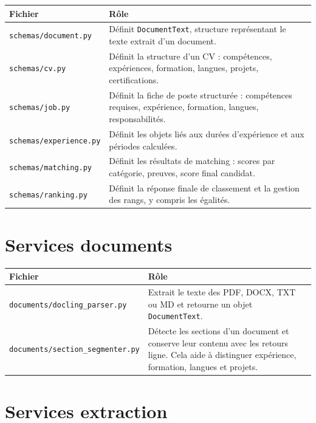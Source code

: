 \documentclass[12pt,a4paper]{report}
\begin{document}
\begin{longtable}{|p{5cm}|p{9cm}|}
\hline
\textbf{Fichier} & \textbf{Rôle} \\
\hline
\endhead
\texttt{schemas/document.py} & Définit \texttt{DocumentText}, structure représentant le texte extrait d'un document. \\
\hline
\texttt{schemas/cv.py} & Définit la structure d'un CV : compétences, expériences, formation, langues, projets, certifications. \\
\hline
\texttt{schemas/job.py} & Définit la fiche de poste structurée : compétences requises, expérience, formation, langues, responsabilités. \\
\hline
\texttt{schemas/experience.py} & Définit les objets liés aux durées d'expérience et aux périodes calculées. \\
\hline
\texttt{schemas/matching.py} & Définit les résultats de matching : scores par catégorie, preuves, score final candidat. \\
\hline
\texttt{schemas/ranking.py} & Définit la réponse finale de classement et la gestion des rangs, y compris les égalités. \\
\hline
\end{longtable}

\section{Services documents}

\begin{longtable}{|p{5cm}|p{9cm}|}
\hline
\textbf{Fichier} & \textbf{Rôle} \\
\hline
\endhead
\texttt{documents/docling\_parser.py} & Extrait le texte des PDF, DOCX, TXT ou MD et retourne un objet \texttt{DocumentText}. \\
\hline
\texttt{documents/section\_segmenter.py} & Détecte les sections d'un document et conserve leur contenu avec les retours ligne. Cela aide à distinguer expérience, formation, langues et projets. \\
\hline
\end{longtable}

\section{Services extraction}
\end{document}
